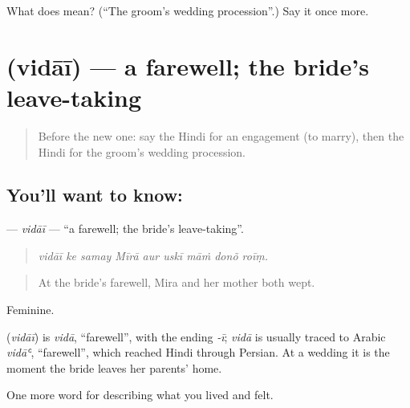 \begin{tcolorbox}[breakable,colback=teal!4,colframe=teal!35!black,title={Before you move on}]
What does  mean? (\textquotedblleft{}The groom's wedding procession\textquotedblright{}.) Say it once more.
\end{tcolorbox}
\section[\texorpdfstring{\hi{विदाई} (vidāī)}{विदाई (vidāī)}]{ (vidāī) — a farewell; the bride's leave-taking}

\label{lesson:HI-C500-vidai}



\begin{quote}
Before the new one: say the Hindi for an engagement (to marry), then the Hindi for the groom's wedding procession.
\end{quote}

\subsection*{You'll want to know: }
\textbf{} — \emph{vidāī} — \textquotedblleft{}a farewell; the bride's leave-taking\textquotedblright{}.

\begin{quote}
        
\end{quote}

\begin{quote}
\emph{vidāī ke samay Mīrā aur uskī māṁ donõ roīṃ.}
\end{quote}

\begin{quote}
At the bride's farewell, Mira and her mother both wept.
\end{quote}

Feminine.

\begin{cousinweb}
\textbf{} (\emph{vidāī}) is \emph{vidā}, \textquotedblleft{}farewell\textquotedblright{}, with the ending \emph{-ī}; \emph{vidā} is usually traced to Arabic \emph{vidāʿ}, \textquotedblleft{}farewell\textquotedblright{}, which reached Hindi through Persian. At a wedding it is the moment the bride leaves her parents' home.
\end{cousinweb}

\begin{grammarlens}[title={What you've built}]
One more word for describing what you lived and felt.
\end{grammarlens}

